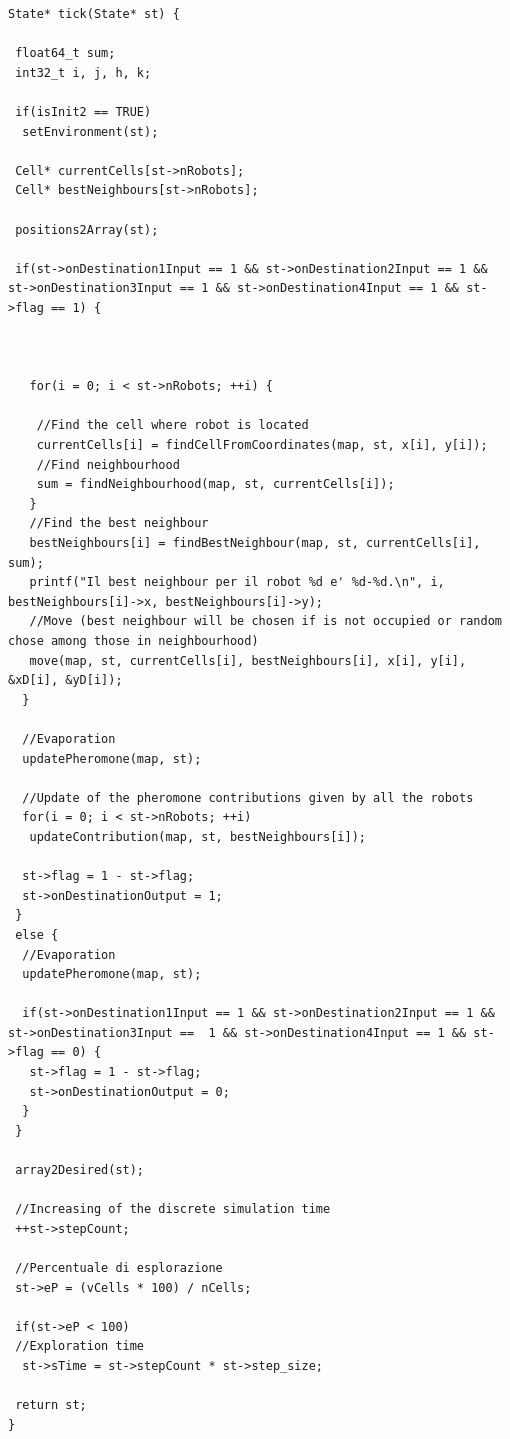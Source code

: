 \documentclass[english]{article}
\begin{document}
\begin{lstlisting}
State* tick(State* st) {

 float64_t sum;
 int32_t i, j, h, k;

 if(isInit2 == TRUE) 
  setEnvironment(st);

 Cell* currentCells[st->nRobots];
 Cell* bestNeighbours[st->nRobots];

 positions2Array(st);

 if(st->onDestination1Input == 1 && st->onDestination2Input == 1 && st->onDestination3Input == 1 && st->onDestination4Input == 1 && st->flag == 1) {



   for(i = 0; i < st->nRobots; ++i) {

    //Find the cell where robot is located
    currentCells[i] = findCellFromCoordinates(map, st, x[i], y[i]);
    //Find neighbourhood
    sum = findNeighbourhood(map, st, currentCells[i]);
   }
   //Find the best neighbour
   bestNeighbours[i] = findBestNeighbour(map, st, currentCells[i], sum);
   printf("Il best neighbour per il robot %d e' %d-%d.\n", i, bestNeighbours[i]->x, bestNeighbours[i]->y);
   //Move (best neighbour will be chosen if is not occupied or random chose among those in neighbourhood)
   move(map, st, currentCells[i], bestNeighbours[i], x[i], y[i], &xD[i], &yD[i]);
  }

  //Evaporation
  updatePheromone(map, st);

  //Update of the pheromone contributions given by all the robots
  for(i = 0; i < st->nRobots; ++i)
   updateContribution(map, st, bestNeighbours[i]);

  st->flag = 1 - st->flag;
  st->onDestinationOutput = 1;
 }
 else {
  //Evaporation
  updatePheromone(map, st);

  if(st->onDestination1Input == 1 && st->onDestination2Input == 1 && st->onDestination3Input ==  1 && st->onDestination4Input == 1 && st->flag == 0) {
   st->flag = 1 - st->flag;
   st->onDestinationOutput = 0;
  }
 }

 array2Desired(st);

 //Increasing of the discrete simulation time
 ++st->stepCount;

 //Percentuale di esplorazione
 st->eP = (vCells * 100) / nCells;

 if(st->eP < 100)
 //Exploration time
  st->sTime = st->stepCount * st->step_size;

 return st;
}
\end{lstlisting}
\end{document}
